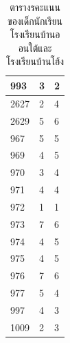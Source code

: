 \begin{table}[h]
\begin{center}
\begin{tabular}{ |p{3cm}|p{2cm}|p{2cm}| }
            \hline
            993 & 3 & 2\\
            \hline
            2627 & 2 & 4\\
            \hline
            2629 & 5 & 6\\
            \hline
            967 & 5 & 5\\
            \hline
            969 & 4 & 5\\
            \hline
            970 & 3 & 4\\
            \hline
            971 & 4 & 4\\
            \hline
            972 & 1 & 1\\
            \hline
            973 & 7 & 6\\
            \hline
            974 & 4 & 5\\
            \hline
            975 & 4 & 5\\
            \hline
            976 & 7 & 6\\
            \hline
            977 & 5 & 4\\
            \hline
            997 & 4 & 3\\
            \hline
            1009 & 2 & 3\\
            \hline
        \end{tabular}
    \end{center}
    \caption[ตารางคะแนนของเด็กนักเรียนโรงเรียนบ้านออนใต้และโรงเรียนบ้านโฮ้ง]{ตารางรคะแนนของเด็กนักเรียนโรงเรียนบ้านออนใต้และโรงเรียนบ้านโฮ้ง}
    \label{studentsscoretable}
\end{table}
